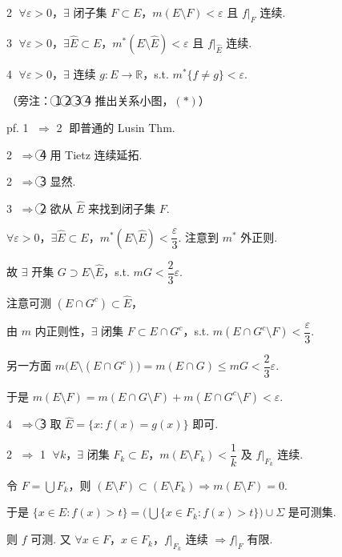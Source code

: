 \documentclass[11pt]{ctexart}
\theoremstyle{definition}
\begin{document}
 \textcircled{2}  $\forall \varepsilon > 0$，$\exists$ 闭子集 $F \subset E$，$m(E \setminus F) < \varepsilon$ 且 $f\vert_F$ 连续.

 \textcircled{3}  $\forall \varepsilon > 0$，$\exists \widehat{E} \subset E$，$m^*(E \setminus \widehat{E}) < \varepsilon$ 且 $f\vert_{\widehat{E}}$ 连续.

 \textcircled{4}  $\forall \varepsilon > 0$，$\exists$ 连续 $g: E \to \mathbb{R}$，s.t. $m^*\{f \neq g\} < \varepsilon$.

（旁注： \textcircled{1}  \textcircled{2}  \textcircled{3}  \textcircled{4}  推出关系小图，$(\ast)$）

pf.  \textcircled{1}  $\Rightarrow$  \textcircled{2}  即普通的 Lusin Thm.

 \textcircled{2}  $\Rightarrow$  \textcircled{4}  用 Tietz 连续延拓.

 \textcircled{2}  $\Rightarrow$  \textcircled{3}  显然.

 \textcircled{3}  $\Rightarrow$  \textcircled{2}  欲从 $\widehat{E}$ 来找到闭子集 $F$.

$\forall \varepsilon > 0$，$\exists \widehat{E} \subset E$，$m^*(E \setminus \widehat{E}) < \dfrac{\varepsilon}{3}$. 注意到 $m^*$ 外正则.

故 $\exists$ 开集 $G \supset E \setminus \widehat{E}$，s.t. $mG < \dfrac{2}{3}\varepsilon$.

注意可测 $(E \cap G^c) \subset \widehat{E}$，

由 $m$ 内正则性，$\exists$ 闭集 $F \subset E \cap G^c$，s.t. $m(E \cap G^c \setminus F) < \dfrac{\varepsilon}{3}$.

另一方面 $m\big(E \setminus (E \cap G^c)\big) = m(E \cap G) \leq mG < \dfrac{2}{3}\varepsilon$.

于是 $m(E \setminus F) = m(E \cap G \setminus F) + m(E \cap G^c \setminus F) < \varepsilon$.

 \textcircled{4}  $\Rightarrow$  \textcircled{3}  取 $\widehat{E} = \{x : f(x) = g(x)\}$ 即可.

 \textcircled{2}  $\Rightarrow$  \textcircled{1}  $\forall k$，$\exists$ 闭集 $F_k \subset E$，$m(E \setminus F_k) < \dfrac{1}{k}$ 及 $f\vert_{F_k}$ 连续.

令 $F = \bigcup F_k$，则 $(E \setminus F) \subset (E \setminus F_k) \Rightarrow m(E \setminus F) = 0$.

于是 $\{x \in E : f(x) > t\} = \big(\bigcup \{x \in F_k : f(x) > t\}\big) \cup \Sigma$ 是可测集.

则 $f$ 可测. 又 $\forall x \in F$，$x \in F_k$，$f\vert_{F_k}$ 连续 $\Rightarrow f\vert_F$ 有限.
\end{document}
